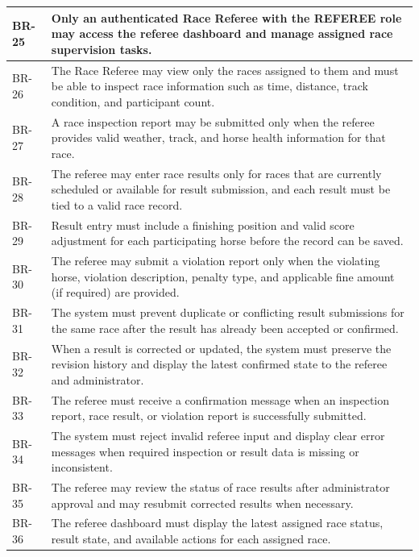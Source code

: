 \vspace{1em}

\begin{table}[H]
    \centering
    \begin{tabular}{|l|p{12cm}|}
        \hline
        BR-25 & Only an authenticated Race Referee with the REFEREE role may access the referee dashboard and manage assigned race supervision tasks. \\
        \hline
        BR-26 & The Race Referee may view only the races assigned to them and must be able to inspect race information such as time, distance, track condition, and participant count. \\
        \hline
        BR-27 & A race inspection report may be submitted only when the referee provides valid weather, track, and horse health information for that race. \\
        \hline
        BR-28 & The referee may enter race results only for races that are currently scheduled or available for result submission, and each result must be tied to a valid race record. \\
        \hline
        BR-29 & Result entry must include a finishing position and valid score adjustment for each participating horse before the record can be saved. \\
        \hline
        BR-30 & The referee may submit a violation report only when the violating horse, violation description, penalty type, and applicable fine amount (if required) are provided. \\
        \hline
        BR-31 & The system must prevent duplicate or conflicting result submissions for the same race after the result has already been accepted or confirmed. \\
        \hline
        BR-32 & When a result is corrected or updated, the system must preserve the revision history and display the latest confirmed state to the referee and administrator. \\
        \hline
        BR-33 & The referee must receive a confirmation message when an inspection report, race result, or violation report is successfully submitted. \\
        \hline
        BR-34 & The system must reject invalid referee input and display clear error messages when required inspection or result data is missing or inconsistent. \\
        \hline
        BR-35 & The referee may review the status of race results after administrator approval and may resubmit corrected results when necessary. \\
        \hline
        BR-36 & The referee dashboard must display the latest assigned race status, result state, and available actions for each assigned race. \\
        \hline
    \end{tabular}
    \label{tab:race_referee_business_rules}
\end{table}

